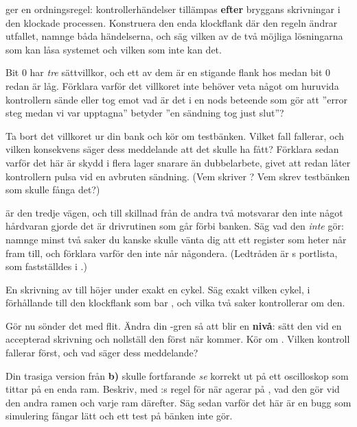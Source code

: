   ger en ordningsregel: kontrollerhändelser tillämpas \textbf{efter}
bryggans skrivningar i den klockade processen. Konstruera den enda klockflank där den regeln ändrar
utfallet, namnge båda händelserna, och säg vilken av de två möjliga lösningarna som kan låsa systemet
och vilken som inte kan det.

 Bit 0 har \emph{tre} sättvillkor, och ett av dem är en stigande flank hos  medan
bit 0 redan är låg. Förklara varför det villkoret inte behöver veta något om huruvida kontrollern
sände eller tog emot \textemdash{} vad är det i en nods beteende som gör att ”error steg medan vi var
upptagna” betyder ”en sändning tog just slut”?

 Ta bort det villkoret ur din bank och kör om testbänken. Vilket fall fallerar, och vilken
konsekvens säger dess meddelande att det skulle ha fått? Förklara sedan varför det här är skydd i
flera lager snarare än dubbelarbete, givet att  redan låter kontrollern pulsa
 vid en avbruten sändning. (Vem skriver ? Vem skrev testbänken som
skulle fånga det?)

  är den tredje vägen, och till skillnad från de andra två motsvarar den inte
något hårdvaran gjorde \textemdash{} det är drivrutinen som går förbi banken. Säg vad den \emph{inte}
gör: namnge minst två saker du kanske skulle vänta dig att ett register som heter  når
fram till, och förklara varför den inte når någondera. (Ledtråden är s portlista,
som fastställdes i .)

\label{c18:ex:txsend}
 En skrivning av  till  höjer  under exakt en cykel.
Säg exakt vilken cykel, i förhållande till den klockflank som bar , och vilka två
saker  kontrollerar om den.

 Gör nu sönder det med flit. Ändra din -gren så att  blir en
\textbf{nivå}: sätt den vid en accepterad skrivning och nollställ den först när 
kommer. Kör om . Vilken kontroll fallerar först, och vad säger dess meddelande?

 Din trasiga version från \textbf{b)} skulle fortfarande \emph{se} korrekt ut på ett
oscilloskop som tittar på en enda ram. Beskriv, med :s regel för när
 agerar på , vad den gör vid den andra ramen och varje ram
därefter. Säg sedan varför det här är en bugg som simulering fångar lätt och ett test på bänken inte
gör.

